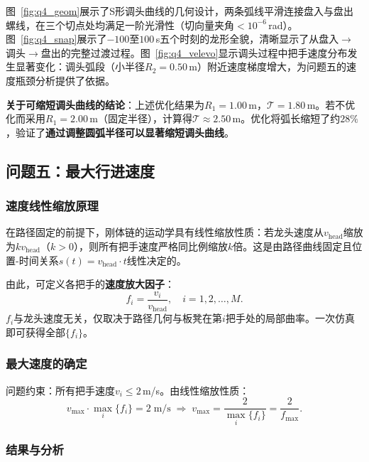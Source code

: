 \documentclass[12pt]{ctexart}
\begin{document}
图~\ref{fig:q4_geom}展示了S形调头曲线的几何设计，两条弧线平滑连接盘入与盘出螺线，在三个切点处均满足一阶光滑性（切向量夹角$<10^{-6}$\,rad）。图~\ref{fig:q4_snap}展示了$-100$至$100$\,s五个时刻的龙形全貌，清晰显示了从盘入$\to$调头$\to$盘出的完整过渡过程。图~\ref{fig:q4_velevo}显示调头过程中把手速度分布发生显著变化：调头弧段（小半径$R_2=0.50$\,m）附近速度梯度增大，为问题五的速度瓶颈分析提供了依据。

\textbf{关于可缩短调头曲线的结论}：上述优化结果为$R_1=1.00$\,m，$\mathcal{T}=1.80$\,m。若不优化而采用$R_1=2.00$\,m（固定半径），计算得$\mathcal{T}\approx 2.50$\,m。优化将弧长缩短了约$28\%$，验证了\textbf{通过调整圆弧半径可以显著缩短调头曲线}。

\FloatBarrier

\subsection{问题五：最大行进速度}

\subsubsection{速度线性缩放原理}

在路径固定的前提下，刚体链的运动学具有线性缩放性质：若龙头速度从$v_{\text{head}}$缩放为$kv_{\text{head}}$（$k>0$），则所有把手速度严格同比例缩放$k$倍。这是由路径曲线固定且位置-时间关系$s(t)=v_{\text{head}}\cdot t$线性决定的。

由此，可定义各把手的\textbf{速度放大因子}：
\begin{equation}
f_i = \frac{v_i}{v_{\text{head}}},\quad i=1,2,\dots,M.
\label{eq:amplification}
\end{equation}
$f_i$与龙头速度无关，仅取决于路径几何与板凳在第$i$把手处的局部曲率。一次仿真即可获得全部$\{f_i\}$。

\subsubsection{最大速度的确定}

问题约束：所有把手速度$v_i\le 2$\,m/s。由线性缩放性质：
\begin{equation}
v_{\max} \cdot \max_i\{f_i\} = 2\;\text{m/s}
\;\Longrightarrow\;
v_{\max} = \frac{2}{\max_i\{f_i\}} = \frac{2}{f_{\max}}.
\label{eq:vmax_formula}
\end{equation}

\subsubsection{结果与分析}
\end{document}
